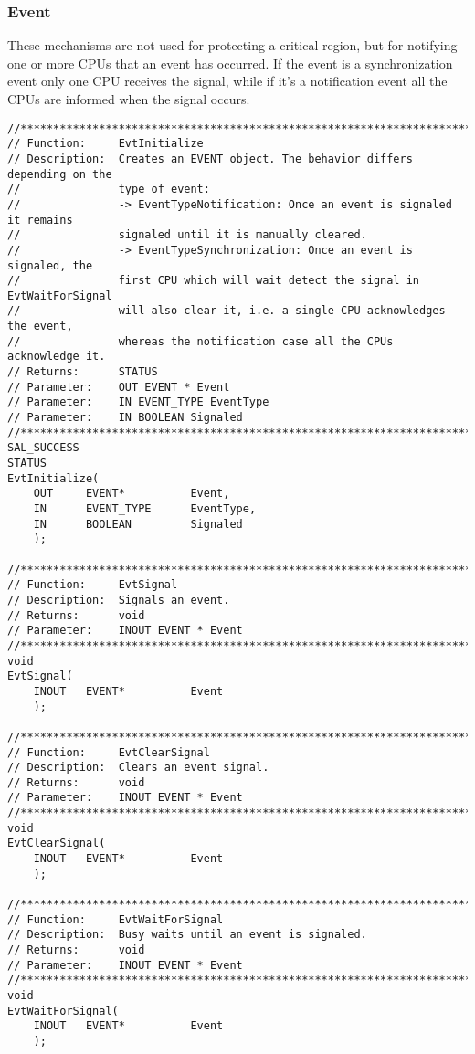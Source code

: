 \begin{appendices}
\subsubsection{Event}

These mechanisms are not used for protecting a critical region, but for notifying one or more CPUs
that an event has occurred. If the event is a synchronization event only one CPU receives the signal,
while if it's a notification event all the CPUs are informed when the signal occurs.

\begin{lstlisting}[caption={Event Interface},label={lst:Event}]
//******************************************************************************
// Function:     EvtInitialize
// Description:  Creates an EVENT object. The behavior differs depending on the
//               type of event:
//               -> EventTypeNotification: Once an event is signaled it remains
//               signaled until it is manually cleared.
//               -> EventTypeSynchronization: Once an event is signaled, the
//               first CPU which will wait detect the signal in EvtWaitForSignal
//               will also clear it, i.e. a single CPU acknowledges the event,
//               whereas the notification case all the CPUs acknowledge it.
// Returns:      STATUS
// Parameter:    OUT EVENT * Event
// Parameter:    IN EVENT_TYPE EventType
// Parameter:    IN BOOLEAN Signaled
//******************************************************************************
SAL_SUCCESS
STATUS
EvtInitialize(
    OUT     EVENT*          Event,
    IN      EVENT_TYPE      EventType,
    IN      BOOLEAN         Signaled
    );

//******************************************************************************
// Function:     EvtSignal
// Description:  Signals an event.
// Returns:      void
// Parameter:    INOUT EVENT * Event
//******************************************************************************
void
EvtSignal(
    INOUT   EVENT*          Event
    );

//******************************************************************************
// Function:     EvtClearSignal
// Description:  Clears an event signal.
// Returns:      void
// Parameter:    INOUT EVENT * Event
//******************************************************************************
void
EvtClearSignal(
    INOUT   EVENT*          Event
    );

//******************************************************************************
// Function:     EvtWaitForSignal
// Description:  Busy waits until an event is signaled.
// Returns:      void
// Parameter:    INOUT EVENT * Event
//******************************************************************************
void
EvtWaitForSignal(
    INOUT   EVENT*          Event
    );


\end{lstlisting}
\end{appendices}
